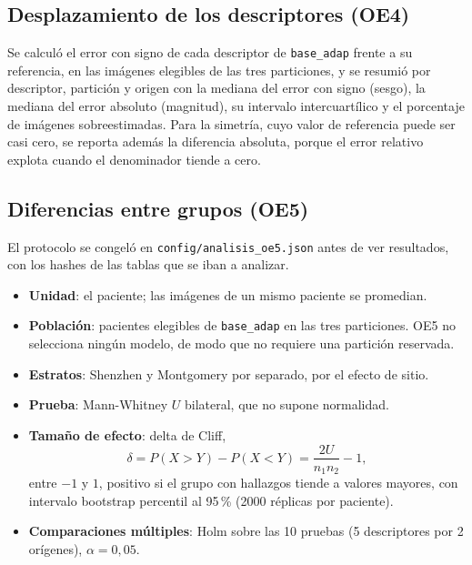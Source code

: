 \subsection{Desplazamiento de los descriptores (OE4)}
\label{sec:met-oe4}

Se calculó el error con signo de cada descriptor de \texttt{base\_adap} frente a
su referencia, en las imágenes elegibles de las tres particiones, y se resumió por
descriptor, partición y origen con la mediana del error con signo (sesgo), la
mediana del error absoluto (magnitud), su intervalo intercuartílico y el porcentaje
de imágenes sobreestimadas. Para la simetría, cuyo valor de referencia puede ser
casi cero, se reporta además la diferencia absoluta, porque el error relativo
explota cuando el denominador tiende a cero.

\subsection{Diferencias entre grupos (OE5)}
\label{sec:met-oe5}

El protocolo se congeló en \texttt{config/analisis\_oe5.json} antes de ver
resultados, con los hashes de las tablas que se iban a analizar.

\begin{itemize}
    \item \textbf{Unidad}: el paciente; las imágenes de un mismo paciente se
    promedian.
    \item \textbf{Población}: pacientes elegibles de \texttt{base\_adap} en las tres
    particiones. OE5 no selecciona ningún modelo, de modo que no requiere una
    partición reservada.
    \item \textbf{Estratos}: Shenzhen y Montgomery por separado, por el efecto de
    sitio.
    \item \textbf{Prueba}: Mann-Whitney $U$ bilateral, que no supone normalidad.
    \item \textbf{Tamaño de efecto}: delta de Cliff,
    \begin{equation}
    \delta = P(X > Y) - P(X < Y) = \frac{2U}{n_1 n_2} - 1,
    \end{equation}
    entre $-1$ y $1$, positivo si el grupo con hallazgos tiende a valores mayores,
    con intervalo bootstrap percentil al 95\,\% (2000 réplicas por paciente).
    \item \textbf{Comparaciones múltiples}: Holm sobre las 10 pruebas
    (5 descriptores por 2 orígenes), $\alpha = 0{,}05$.
\end{itemize}

